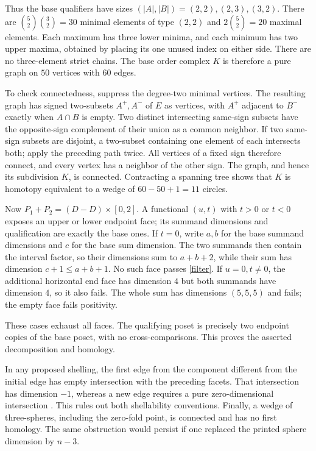 \documentclass[11pt]{article}
\begin{document}
Thus the base qualifiers have sizes $(|A|,|B|)=(2,2),(2,3),(3,2)$.
There are $\binom52\binom32=30$ minimal elements of type $(2,2)$
and $2\binom52=20$ maximal elements. Each maximum has three lower
minima, and each minimum has two upper maxima, obtained by placing
its one unused index on either side. There are no three-element
strict chains. The base order complex $K$ is therefore a pure graph
on $50$ vertices with $60$ edges.

To check connectedness, suppress the degree-two minimal vertices.
The resulting graph has signed two-subsets $A^+,A^-$ of $E$ as
vertices, with $A^+$ adjacent to $B^-$ exactly when $A\cap B$ is empty.
Two distinct intersecting same-sign subsets have the opposite-sign
complement of their union as a common neighbor. If two same-sign
subsets are disjoint, a two-subset containing one element of each
intersects both; apply the preceding path twice. All vertices of a
fixed sign therefore connect, and every vertex has a neighbor of
the other sign. The graph, and hence its subdivision $K$, is connected.
Contracting a spanning tree shows that $K$ is homotopy equivalent
to a wedge of $60-50+1=11$ circles.

Now $P_1+P_2=(D-D)\times[0,2]$. A functional $(u,t)$ with $t>0$
or $t<0$ exposes an upper or lower endpoint face; its summand
dimensions and qualification are exactly the base ones.
If $t=0$, write $a,b$ for the base summand dimensions and $c$ for
the base sum dimension. The two summands then contain the interval
factor, so their dimensions sum to $a+b+2$, while their sum has
dimension $c+1\le a+b+1$. No such face passes \eqref{filter}.
If $u=0,t\ne0$, the additional horizontal end face has dimension
$4$ but both summands have dimension $4$, so it also fails.
The whole sum has dimensions $(5,5,5)$ and fails; the empty face
fails positivity.

These cases exhaust all faces. The qualifying poset is precisely
two endpoint copies of the base poset, with no cross-comparisons.
This proves the asserted decomposition and homology.

In any proposed shelling, the first edge from the component different
from the initial edge has empty intersection with the preceding
facets. That intersection has dimension $-1$, whereas a new edge
requires a pure zero-dimensional intersection
\cite[Definition~2.1]{BW}. This rules out both shellability conventions.
Finally, a wedge of three-spheres, including the zero-fold point,
is connected and has no first homology. The same obstruction would
persist if one replaced the printed sphere dimension by $n-3$.
\end{document}
